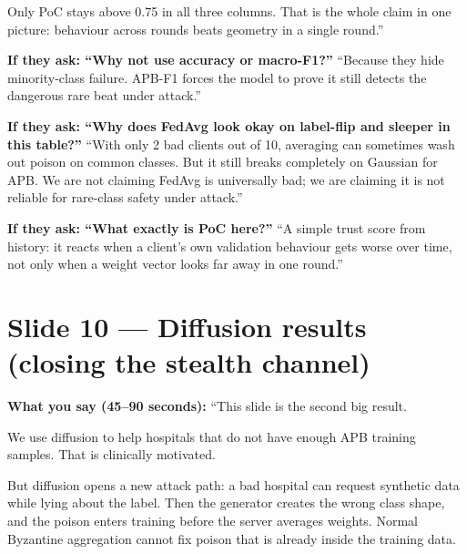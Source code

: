 \documentclass[11pt,a4paper]{article}
\begin{document}
Only PoC stays above 0.75 in all three columns. That is the whole claim in one picture: behaviour across rounds beats geometry in a single round.''

\textbf{If they ask: ``Why not use accuracy or macro-F1?''}
``Because they hide minority-class failure. APB-F1 forces the model to prove it still detects the dangerous rare beat under attack.''

\textbf{If they ask: ``Why does FedAvg look okay on label-flip and sleeper in this table?''}
``With only 2 bad clients out of 10, averaging can sometimes wash out poison on common classes. But it still breaks completely on Gaussian for APB. We are not claiming FedAvg is universally bad; we are claiming it is not reliable for rare-class safety under attack.''

\textbf{If they ask: ``What exactly is PoC here?''}
``A simple trust score from history: it reacts when a client's own validation behaviour gets worse over time, not only when a weight vector looks far away in one round.''

\section{Slide 10 --- Diffusion results (closing the stealth channel)}

\textbf{What you say (45--90 seconds):}
``This slide is the second big result.

We use diffusion to help hospitals that do not have enough APB training samples. That is clinically motivated.

But diffusion opens a new attack path: a bad hospital can request synthetic data while lying about the label. Then the generator creates the wrong class shape, and the poison enters training before the server averages weights. Normal Byzantine aggregation cannot fix poison that is already inside the training data.
\end{document}
